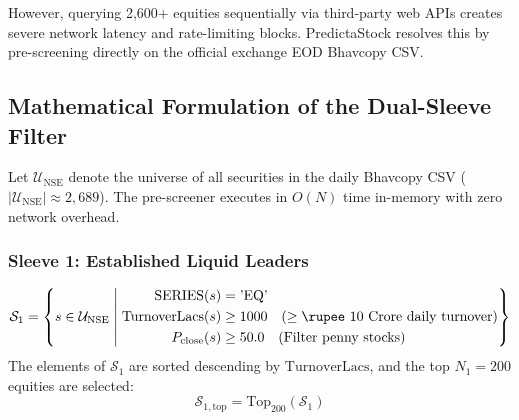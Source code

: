 \documentclass[11pt,a4paper]{article}
\begin{document}
However, querying 2,600+ equities sequentially via third-party web APIs creates severe network latency and rate-limiting blocks. PredictaStock resolves this by pre-screening directly on the official exchange EOD Bhavcopy CSV.

\subsection{Mathematical Formulation of the Dual-Sleeve Filter}
Let $\mathcal{U}_{\text{NSE}}$ denote the universe of all securities in the daily Bhavcopy CSV ($|\mathcal{U}_{\text{NSE}}| \approx 2,689$). The pre-screener executes in $O(N)$ time in-memory with zero network overhead.

\subsubsection{Sleeve 1: Established Liquid Leaders}
\begin{equation}
\mathcal{S}_1 = \left\{ s \in \mathcal{U}_{\text{NSE}} \;\middle|\;
\begin{aligned}
\text{SERIES}(s) &= \text{'EQ'} \\
\text{TurnoverLacs}(s) &\ge 1000 \quad (\ge \text{\rupee 10 Crore daily turnover}) \\
P_{\text{close}}(s) &\ge 50.0 \quad (\text{Filter penny stocks})
\end{aligned}
\right\}
\end{equation}
The elements of $\mathcal{S}_1$ are sorted descending by $\text{TurnoverLacs}$, and the top $N_1 = 200$ equities are selected:
\begin{equation}
\mathcal{S}_{1, \text{top}} = \text{Top}_{200} \left( \mathcal{S}_1 \right)
\end{equation}
\end{document}
